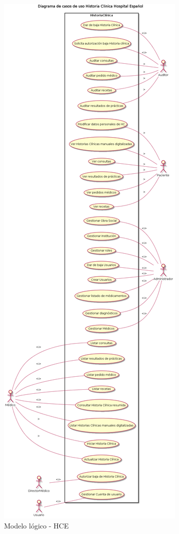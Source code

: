 \begin{figure}
  \centering
  \includegraphics[width=.688\textwidth]{img/tp1/HCHEModeloFuncional}
  \caption{Modelo lógico - HCE}
  \label{mlogicoHCE}
\end{figure}



